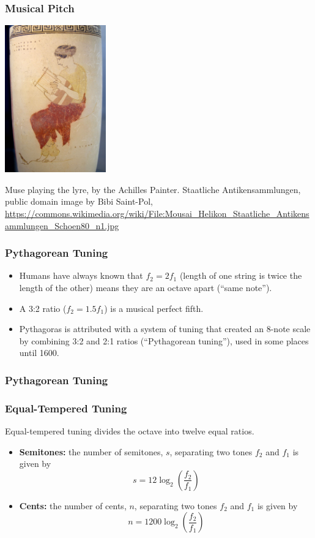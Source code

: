 \documentclass{beamer}
\begin{document}
\begin{frame}
  \frametitle{Musical Pitch}
  \centerline{\includegraphics[height=2.5in]{helikon.jpg}}
  \begin{tiny}
    Muse playing the lyre, by the Achilles Painter.  Staatliche
    Antikensammlungen, public domain image by Bibi Saint-Pol,
    \url{https://commons.wikimedia.org/wiki/File:Mousai_Helikon_Staatliche_Antikensammlungen_Schoen80_n1.jpg}
  \end{tiny}
\end{frame}

\begin{frame}
  \frametitle{Pythagorean Tuning}
  \begin{itemize}
  \item Humans have always known that $f_2=2f_1$ (length of one string
    is twice the length of the other) means they are an octave apart
    (``same note'').
  \item A 3:2 ratio ($f_2=1.5f_1$) is a musical perfect fifth.
  \item Pythagoras is attributed with a system of tuning that created
    an 8-note scale by combining 3:2 and 2:1 ratios (``Pythagorean
    tuning''), used in some places until 1600.
  \end{itemize}
\end{frame}

\begin{frame}
  \frametitle{Pythagorean Tuning}
  \centerline{}
\end{frame}

\begin{frame}
  \frametitle{Equal-Tempered Tuning}

  Equal-tempered tuning divides the octave into twelve equal ratios.
  \begin{itemize}
  \item {\bf Semitones:} the number of semitones, $s$, separating two
    tones $f_2$ and $f_1$ is given by
    \[
    s = 12\log_2\left(\frac{f_2}{f_1}\right)
    \]
  \item {\bf Cents:} the number of cents, $n$, separating two tones
    $f_2$ and $f_1$ is given by
    \[
    n = 1200\log_2\left(\frac{f_2}{f_1}\right)
    \]
  \end{itemize}
\end{frame}
\end{document}
